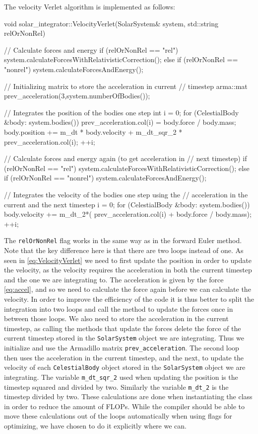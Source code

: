 \documentclass[reprint,english,notitlepage]{revtex4-1}  %
\begin{document}
The velocity Verlet algorithm is implemented as follows:

\begin{cpp}
void solar_integrator::VelocityVerlet(SolarSystem& system,
									  std::string relOrNonRel) {
  // Calculate forces and energy
  if (relOrNonRel == "rel") {
    system.calculateForcesWithRelativisticCorrection();
  } else if (relOrNonRel == "nonrel") {
    system.calculateForcesAndEnergy();
  }

  // Initializing matrix to store the acceleration in current 
  // timestep
  arma::mat prev_acceleration(3,system.numberOfBodies());

  // Integrates the position of the bodies one step
  int i = 0;
  for (CelestialBody &body: system.bodies()) {
    prev_acceleration.col(i) = body.force / body.mass;
    body.position += m_dt * body.velocity 
    				 + m_dt_sqr_2 * prev_acceleration.col(i);
    ++i;
  }

  // Calculate forces and energy again (to get acceleration in 
  // next timestep)
  if (relOrNonRel == "rel") {
    system.calculateForcesWithRelativisticCorrection();
  } else if (relOrNonRel == "nonrel") {
    system.calculateForcesAndEnergy();
  }

  // Integrates the velocity of the bodies one step using the 
  // acceleration in the current and the next timestep
  i = 0;
  for (CelestialBody &body: system.bodies()) {
    body.velocity += m_dt_2*( prev_acceleration.col(i) 
    				 + body.force / body.mass);
    ++i;
  }
}
\end{cpp}

The \verb+relOrNonRel+ flag works in the same way as in the forward Euler method. Note that the key difference here is that there are two loops instead of one. As seen in \eqref{eq:VelocityVerlet} we need to first update the position in order to update the velocity, as the velocity requires the acceleration in both the current timestep and the one we are integrating to. The acceleration is given by the force \eqref{eq:accel}, and so we need to calculate the force again before we can calculate the velocity. In order to improve the efficiency of the code it is thus better to split the integration into two loops and call the method to update the forces once in between those loops. We also need to store the acceleration in the current timestep, as calling the methods that update the forces delete the force of the current timestep stored in the \verb+SolarSystem+ object we are integrating. Thus we initialize and use the Armadillo \citep{Armadillo} matrix \verb+prev_acceleration+. The second loop then uses the acceleration in the current timestep, and the next, to update the velocity of each \verb+CelestialBody+ object stored in the \verb+SolarSystem+ object we are integrating. The variable \verb+m_dt_sqr_2+ used when updating the position is the timestep squared and divided by two. Similarly the variable \verb+m_dt_2+ is the timestep divided by two. These calculations are done when instantiating the class in order to reduce the amount of FLOPs. While the compiler should be able to move these calculations out of the loops automatically when using flags for optimizing, we have chosen to do it explicitly where we can.
\end{document}
